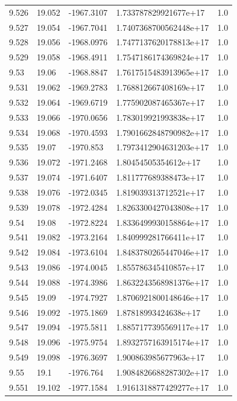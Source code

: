 \begin{tabular}{lllll}
9.526 & 19.052 & -1967.3107 & 1.733787829921677e+17 & 1.0 \\
9.527 & 19.054 & -1967.7041 & 1.7407368700562448e+17 & 1.0 \\
9.528 & 19.056 & -1968.0976 & 1.7477137620178813e+17 & 1.0 \\
9.529 & 19.058 & -1968.4911 & 1.7547186174369824e+17 & 1.0 \\
9.53 & 19.06 & -1968.8847 & 1.7617515483913965e+17 & 1.0 \\
9.531 & 19.062 & -1969.2783 & 1.768812667408169e+17 & 1.0 \\
9.532 & 19.064 & -1969.6719 & 1.775902087465367e+17 & 1.0 \\
9.533 & 19.066 & -1970.0656 & 1.783019921993838e+17 & 1.0 \\
9.534 & 19.068 & -1970.4593 & 1.7901662848790982e+17 & 1.0 \\
9.535 & 19.07 & -1970.853 & 1.7973412904631203e+17 & 1.0 \\
9.536 & 19.072 & -1971.2468 & 1.80454505354612e+17 & 1.0 \\
9.537 & 19.074 & -1971.6407 & 1.811777689388473e+17 & 1.0 \\
9.538 & 19.076 & -1972.0345 & 1.819039313712521e+17 & 1.0 \\
9.539 & 19.078 & -1972.4284 & 1.8263300427043808e+17 & 1.0 \\
9.54 & 19.08 & -1972.8224 & 1.8336499930158864e+17 & 1.0 \\
9.541 & 19.082 & -1973.2164 & 1.840999281766411e+17 & 1.0 \\
9.542 & 19.084 & -1973.6104 & 1.8483780265447046e+17 & 1.0 \\
9.543 & 19.086 & -1974.0045 & 1.855786345410857e+17 & 1.0 \\
9.544 & 19.088 & -1974.3986 & 1.8632243568981376e+17 & 1.0 \\
9.545 & 19.09 & -1974.7927 & 1.8706921800148646e+17 & 1.0 \\
9.546 & 19.092 & -1975.1869 & 1.87818993424638e+17 & 1.0 \\
9.547 & 19.094 & -1975.5811 & 1.8857177395569117e+17 & 1.0 \\
9.548 & 19.096 & -1975.9754 & 1.8932757163915174e+17 & 1.0 \\
9.549 & 19.098 & -1976.3697 & 1.900863985677963e+17 & 1.0 \\
9.55 & 19.1 & -1976.764 & 1.9084826688287302e+17 & 1.0 \\
9.551 & 19.102 & -1977.1584 & 1.9161318877429277e+17 & 1.0 \\

\end{tabular}

